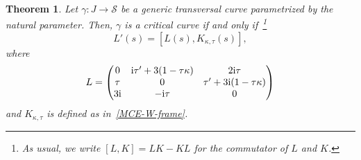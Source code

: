 \documentclass[10pt,a4paper]{amsart}
\numberwithin{equation}{section}
\newtheorem{thmx}{Theorem} %
\def\S{\mathcal{S}}
\def\S{\mathcal{S}}
\begin{document}
\begin{thmx}\label{thmA}
Let $\gamma\colon J \to \S$ be a generic transversal curve parametrized by the natural parameter.
Then, $\gamma$
is a critical curve
if and only if~\footnote{As usual, we write $[L, K] = LK - KL$ for the commutator of $L$ and $K$.}
\begin{equation}\label{Lax-eqn}
L' (s)=
[L (s), K_{\kappa,\tau}(s)] ,
 \end{equation}
where
\begin{equation}\label{obser-L}
 L = \begin{pmatrix}
 0 & {\rm i} \tau'+ 3(1 - \tau\kappa) & 2 {\rm i} \tau\\
 \tau & 0 & \tau'+ 3{\rm i}(1 - \tau\kappa)\\
 3{\rm i} & -{\rm i} \tau& 0\\
 \end{pmatrix}
 \end{equation}
%
and $K_{\kappa,\tau}$ is defined as in~\eqref{MCE-W-frame}.
\end{thmx}
\end{document}
